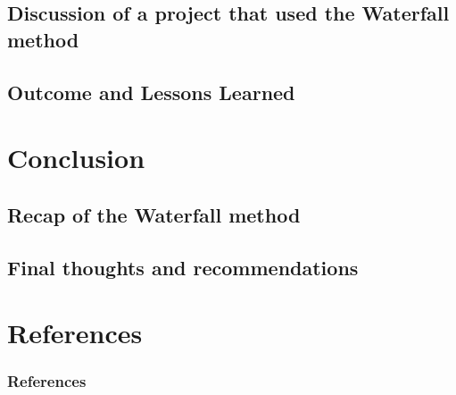 \documentclass{beamer}
\begin{document}
\subsection{Discussion of a project that used the Waterfall method}
\subsection{Outcome and Lessons Learned}




\section{Conclusion}
\subsection{Recap of the Waterfall method}
\subsection{Final thoughts and recommendations}



\section*{References}
\begin{frame}
    \frametitle{References}
    
    
\end{frame}
\end{document}
